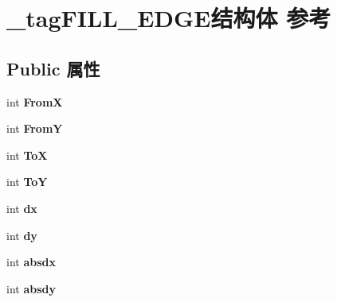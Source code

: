 \hypertarget{struct__tag_f_i_l_l___e_d_g_e}{}\section{\+\_\+tag\+F\+I\+L\+L\+\_\+\+E\+D\+G\+E结构体 参考}
\label{struct__tag_f_i_l_l___e_d_g_e}
\subsection*{Public 属性}
\begin{DoxyCompactItemize}
\item 
\mbox{\label{struct__tag_f_i_l_l___e_d_g_e_ac4bb72474720423263141fe803ee2b31}} 
int {\bfseries FromX}
\item 
\mbox{\label{struct__tag_f_i_l_l___e_d_g_e_a53c430280d4deae4b0f0dd28bb6e478d}} 
int {\bfseries FromY}
\item 
\mbox{\label{struct__tag_f_i_l_l___e_d_g_e_a2abe60c5fb4dd7f4902754d2e621b7bb}} 
int {\bfseries ToX}
\item 
\mbox{\label{struct__tag_f_i_l_l___e_d_g_e_a5e967e4a3c428855c14cc87cbf09432e}} 
int {\bfseries ToY}
\item 
\mbox{\label{struct__tag_f_i_l_l___e_d_g_e_a6d4758316fd314618cee844394fb6cc6}} 
int {\bfseries dx}
\item 
\mbox{\label{struct__tag_f_i_l_l___e_d_g_e_a97e58f975bc15c07a57cc2eb55bd1ff8}} 
int {\bfseries dy}
\item 
\mbox{\label{struct__tag_f_i_l_l___e_d_g_e_ae893afd8e7c698dabccf5e6a0093ebe4}} 
int {\bfseries absdx}
\item 
\mbox{\label{struct__tag_f_i_l_l___e_d_g_e_a5d8829492340931d798d79f284e17731}} 
int {\bfseries absdy}
\item 
\mbox{\label{struct__tag_f_i_l_l___e_d_g_e_a3fa5b2d765c0b47d2c629ed00eeea51f}} 

\end{DoxyCompactItemize}
